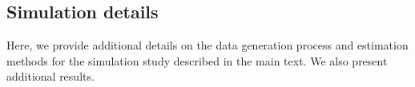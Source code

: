 \begin{appendix}



\newpage 
\section{Simulation details}\label{sec:moresim}
Here, we provide additional details on the data generation process and estimation methods for the simulation study described in the main text. We also present additional results. 


\end{appendix}
